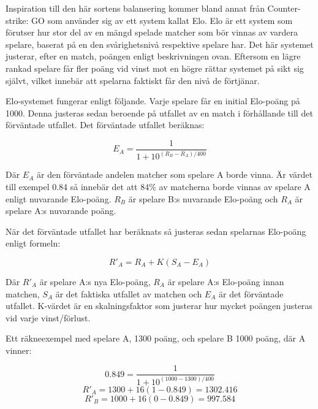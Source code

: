 \documentclass[a4paper, 11pt]{article}
\begin{document}
Inspiration till den här sortens balansering kommer bland annat från Counter-strike: GO \cite{cs} som använder sig av ett system kallat Elo\cite{elo}. Elo är ett system som förutser hur stor del av en mängd spelade matcher som bör vinnas av vardera spelare, baserat på en den svårighetsnivå respektive spelare har. Det här systemet justerar, efter en match, poängen enligt beskrivningen ovan. Eftersom en lägre rankad spelare får fler poäng vid vinst mot en högre rättar systemet på sikt sig självt, vilket innebär att spelarna faktiskt får den nivå de förtjänar.

Elo-systemet fungerar enligt följande. Varje spelare får en initial Elo-poäng på 1000. Denna justeras sedan beroende på utfallet av en match i förhållande till det förväntade utfallet. Det förväntade utfallet beräknas:

$$E_A = \frac{1}{1+10^{(R_B-R_A)/400}}$$

Där $E_A$ är den förväntade andelen matcher som spelare A borde vinna. Är värdet till exempel 0.84 så innebär det att 84\% av matcherna borde vinnas av spelare A enligt nuvarande Elo-poäng. $R_B$ är spelare B:s nuvarande Elo-poäng och $R_A$ är spelare A:s nuvarande poäng.

När det förväntade utfallet har beräknats så justeras sedan spelarnas Elo-poäng enligt formeln:

$$R'_A = R_A + K(S_A-E_A)$$

Där $R'_A$ är spelare A:s nya Elo-poäng, $R_A$ är spelare A:s Elo-poäng innan matchen, $S_A$ är det faktiska utfallet av matchen och $E_A$ är det förväntade utfallet. K-värdet är en skalningsfaktor som justerar hur mycket poängen justeras vid varje vinst/förlust.

Ett räkneexempel med spelare A, 1300 poäng, och spelare B 1000 poäng, där A vinner:

$$0.849 = \frac{1}{1+10^{(1000-1300)/400}}$$
$$ R'_A = 1300 + 16(1-0.849) = 1302.416 $$
$$ R'_B = 1000 + 16(0-0.849) = 997.584 $$
\end{document}
